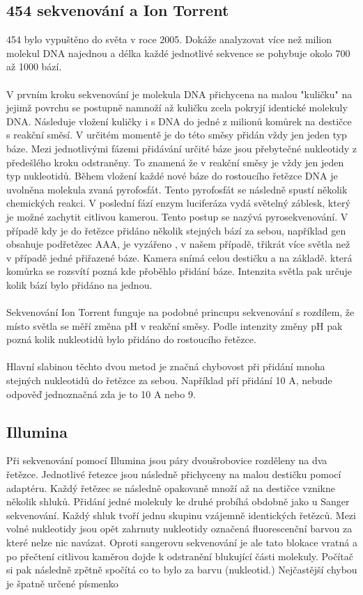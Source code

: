 \documentclass[czech,DP]{thesiskiv}
\begin{document}
\subsection{454 sekvenování a Ion Torrent}
454 bylo vypuštěno do světa v roce 2005. Dokáže analyzovat více než milion molekul DNA najednou a délka každé jednotlivé sekvence se pohybuje okolo 700 až 1000 bází.
\\
\\
V prvním kroku sekvenování je molekula DNA přichycena na malou "kuličku" na jejimž povrchu se postupně namnoží až kuličku zcela pokryjí identické molekuly DNA. Následuje vložení kuličky i s DNA do jedné z milionů komůrek na destičce s reakční směsí. V určitém momentě je do této směsy přidán vždy jen jeden typ báze. Mezi jednotlivými fázemi přidávání určité báze jsou přebytečné nukleotidy z předešlého kroku odstraněny. To znamená že v reakční směsy je vždy jen jeden typ nukleotidů. Během vložení každé nové báze do rostoucího řetězce DNA je uvolněna molekula zvaná pyrofosfát.  Tento pyrofosfát se následně spustí několik chemických reakci. V poslední fází enzym luciferáza vydá světelný záblesk, který je možné zachytit citlivou kamerou.  Tento postup se nazývá pyrosekvenování. V případě kdy je do řetězce přidáno několik stejných bází za sebou, například gen obsahuje podřetězec AAA, je vyzářeno , v našem případě, třikrát více světla než v případě jedné přiřazené báze. Kamera snímá celou destičku a na základě. která komůrka se rozsvítí pozná kde přoběhlo přidání báze. Intenzita světla pak určuje kolik bází bylo přidáno na jednou. 
\\
\\
Sekvenování Ion Torrent funguje na podobné princupu sekvenování s rozdílem, že místo světla se měří změna pH v reakční směsy. Podle intenzity změny pH pak pozná kolik nukleotidů bylo přidáno do rostoucího řetězce.
\\
\\
Hlavní slabinou těchto dvou metod je značná chybovost při přidání mnoha stejných nukleotidů do řetězce za sebou. Například pří přidání 10 A, nebude odpověď jednoznačná zda je to 10 A nebo 9.


\subsection{Illumina}
Při sekvenování pomocí Illumina jsou páry dvoušrobovice rozděleny na dva řetězce. Jednotlivé řetezce jsou následně přichyceny na malou destičku pomocí adaptéru. Každý řetězec se následně opakovaně množí až na destičce vznikne několik shluků. Přidání jedné molekuly ke druhé probíhá obdobně jako u Sanger sekvenování. Každý shluk tvoří jednu skupinu vzájemně identických řetězců. Mezi volné nukleotidy jsou opět zahrnuty nukleotidy označená fluorescenční barvou za které nelze nic navázat. Oproti sangerovu sekvenování je ale tato blokace vratná a po přečtení citlivou kaměrou dojde k odstranění blukující části molekuly. Počítač si pak následně zpětně spočítá co to bylo za barvu (nukleotid.) 
Nejčastější chybou je špatně určené písmenko
  
\end{document}
